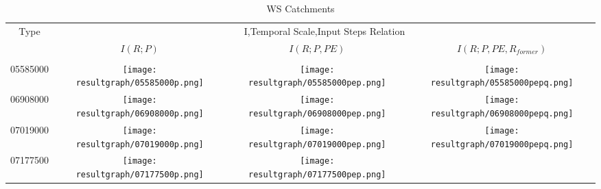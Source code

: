 \begin{table}[H]
\caption{WS Catchments}
\resizebox{\textwidth}{!}
{
\centering
\begin{tabular}{cccc}
\toprule
\multirow{2}{*}{Type}&\multicolumn{3}{c}{I,Temporal Scale,Input Steps Relation}\\\cline{2-4}
&$I(R;P)$&$I(R;P,PE)$&$I(R;P,PE,R_{former})$\\\hline
\\
05585000
&\begin{minipage}{.3\textwidth}\texttt{[image: resultgraph/05585000p.png]}\end{minipage}
&\begin{minipage}{.3\textwidth}\texttt{[image: resultgraph/05585000pep.png]}\end{minipage}
&\begin{minipage}{.3\textwidth}\texttt{[image: resultgraph/05585000pepq.png]}\end{minipage}
\\
06908000&\begin{minipage}{.3\textwidth}\texttt{[image: resultgraph/06908000p.png]}\end{minipage}
&\begin{minipage}{.3\textwidth}\texttt{[image: resultgraph/06908000pep.png]}\end{minipage}
&\begin{minipage}{.3\textwidth}\texttt{[image: resultgraph/06908000pepq.png]}\end{minipage} 
\\
07019000&\begin{minipage}{.3\textwidth}\texttt{[image: resultgraph/07019000p.png]}\end{minipage}
&\begin{minipage}{.3\textwidth}\texttt{[image: resultgraph/07019000pep.png]}\end{minipage}
&\begin{minipage}{.3\textwidth}\texttt{[image: resultgraph/07019000pepq.png]}\end{minipage} 
\\
07177500&\begin{minipage}{.3\textwidth}\texttt{[image: resultgraph/07177500p.png]}\end{minipage}
&\begin{minipage}{.3\textwidth}\texttt{[image: resultgraph/07177500pep.png]}\end{minipage}

\end{tabular}}
\end{table}
